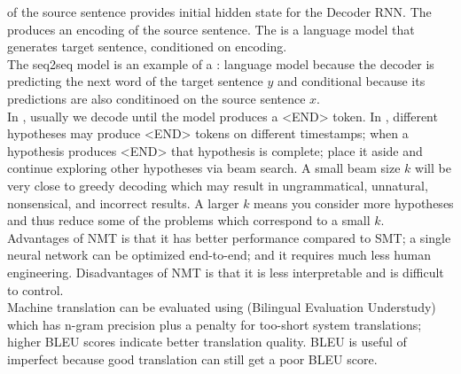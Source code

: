 \documentclass{article}
\begin{document}
 of the source sentence provides initial hidden state for the Decoder RNN. The  produces an encoding of the source sentence. The  is a language model that generates target sentence, conditioned on encoding. \\ 

The seq2seq model is an example of a : language model because the decoder is predicting the next word of the target sentence $y$ and conditional because its predictions are also conditinoed on the source sentence $x$. \\ 

In , usually we decode until the model produces a <END> token. In , different hypotheses may produce <END> tokens on different timestamps; when a hypothesis produces <END> that hypothesis is complete; place it aside and continue exploring other hypotheses via beam search. A small beam size $k$ will be very close to greedy decoding which may result in ungrammatical, unnatural, nonsensical, and incorrect results. A larger $k$ means you consider more hypotheses and thus reduce some of the problems which correspond to a small $k$. \\ 

Advantages of NMT is that it has better performance compared to SMT; a single neural network can be optimized end-to-end; and it requires much less human engineering. Disadvantages of NMT is that it is less interpretable and is difficult to control. \\ 

Machine translation can be evaluated using  (Bilingual Evaluation Understudy) which has n-gram precision plus a penalty for too-short system translations; higher BLEU scores indicate better translation quality. BLEU is useful of imperfect because good translation can still get a poor BLEU score. 
\end{document}
